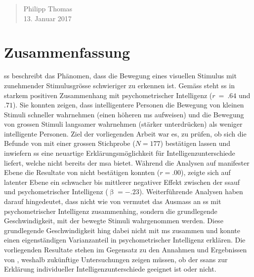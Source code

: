 \documentclass[11pt, twoside, a4paper]{book}		%
\begin{document}
\begin{quote}
Philipp Thomas\\
13. Januar 2017
\end{quote}


\chapter*{Zusammenfassung \label{cha:Zusammenfassung}}

\gls{ss} beschreibt das Phänomen, dass die Bewegung eines visuellen Stimulus mit zunehmender Stimulusgrösse schwieriger zu erkennen ist.
Gemäss \citet{Melnick2013} steht \gls{ss} in starkem positiven Zusammenhang mit psychometrischer Intelligenz ($r~=~.64$ und $.71$). Sie konnten zeigen, dass intelligentere Personen die Bewegung von kleinen Stimuli schneller wahrnehmen (einen höheren \gls{ms} aufweisen) und die Bewegung von grossen Stimuli langsamer wahrnehmen (stärker unterdrücken) als weniger intelligente Personen.
Ziel der vorliegenden Arbeit war es, zu prüfen, ob sich die Befunde von \citeauthor{Melnick2013} mit einer grossen Stichprobe ($N=177$) bestätigen lassen und inwiefern \gls{ss} eine neuartige Erklärungsmöglichkeit für Intelligenzunterschiede liefert, welche nicht bereits der \gls{msa} bietet.
Während die Analysen auf manifester Ebene die Resultate von \citeauthor{Melnick2013} nicht bestätigen konnten ($r=.00$), zeigte sich auf latenter Ebene ein schwacher bis mittlerer negativer Effekt zwischen der \gls{ssauf} und psychometrischer Intelligenz ($\upbeta=-.23$). 
Weiterführende Analysen haben darauf hingedeutet, dass nicht wie von \citeauthor{Melnick2013} vermutet das Ausmass an \gls{ss} mit psychometrischer Intelligenz zusammenhing, sondern die grundlegende Geschwindigkeit, mit der bewegte Stimuli wahrgenommen werden. 
Diese grundlegende Geschwindigkeit hing dabei nicht mit \gls{ms} zusammen und konnte einen eigenständigen Varianzanteil in psychometrischer Intelligenz erklären.
Die vorliegenden Resultate stehen im Gegensatz zu den Annahmen und Ergebnissen von \citeauthor{Melnick2013}, weshalb
zukünftige Untersuchungen zeigen müssen, ob der \gls{ssans} zur Erklärung individueller Intelligenzunterschiede geeignet ist oder nicht.


\begingroup%
\hypersetup{linkcolor=black}					%
\renewcommand{\contentsname}{Inhalte}			%
\setcounter{tocdepth}{3}						%
\tableofcontents								%
\endgroup
\end{document}
